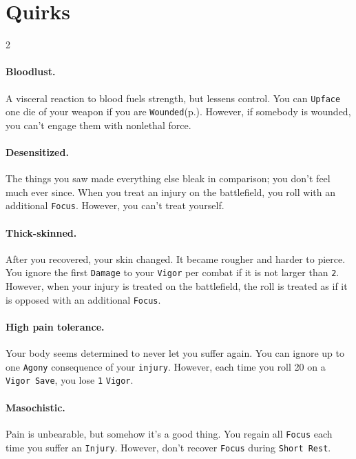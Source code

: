 \documentclass{osr-template/zine}
\begin{document}
\newpage

\section*{\centering \fontsize{35}{45}\selectfont Quirks}
\vspace*{0.4 cm}

\label{sec:quirks}

\begin{multicols*}{2}

\paragraph{Bloodlust.} A visceral reaction to blood fuels strength, but lessens control.
You can \texttt{Upface} one die of your weapon if you are \texttt{Wounded}(p.\pageref*{sec:wounded}). However, if somebody is wounded, you can't engage them with nonlethal force.

\paragraph{Desensitized.} The things you saw made everything else bleak in comparison; you don't feel much ever since.
When you treat an injury on the battlefield, you roll with an additional \texttt{Focus}. However, you can't treat yourself.

\paragraph{Thick-skinned.} After you recovered, your skin changed. It became rougher and harder to pierce.
You ignore the first \texttt{Damage} to your \texttt{Vigor} per combat if it is not larger than \texttt{2}.
However, when your injury is treated on the battlefield, the roll is treated as if it is opposed with an additional \texttt{Focus}.

\paragraph{High pain tolerance.} Your body seems determined to never let you suffer again.
You can ignore up to one \texttt{Agony} consequence of your \texttt{injury}.
However, each time you roll 20 on a \texttt{Vigor Save}, you lose \texttt{1} \texttt{Vigor}.

\paragraph{Masochistic.} Pain is unbearable, but somehow it's a good thing. You regain all \texttt{Focus} each time you suffer an \texttt{Injury}.
However, don't recover \texttt{Focus} during \texttt{Short Rest}.


\end{multicols*}
\end{document}
